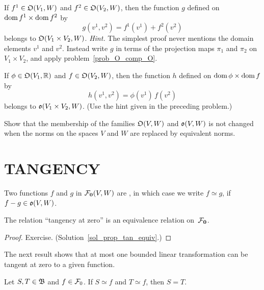 \begin{prob} If $f^1 \in \mathfrak{O}(V_1,W)$ and $f^2 \in \mathfrak{O}(V_2,W)$, then the function $g$
defined on $\operatorname{dom} f^1 \times \operatorname{dom} f^2$ by
  \[ g(v^1,v^2) = f^1(v^1) + f^2(v^2) \]
belongs to $\mathfrak{O}(V_1 \times V_2, W)$. \emph{Hint.}  The simplest proof never mentions the
domain elements $v^1$ and $v^2$. Instead write $g$ in terms of the projection maps $\pi_1$ and
$\pi_2$ on $V_1 \times V_2$, and apply problem~\ref{prob_O_comp_O}.
\end{prob}

\begin{prob} If $\phi \in \mathfrak{O}(V_1,\mathbb{R})$ and $f \in \mathfrak{O}(V_2,W)$, then the function $h$
defined on $\operatorname{dom} \phi \times \operatorname{dom} f$ by
  \[ h(v^1,v^2) = \phi(v^1)\,f(v^2) \]
belongs to $\mathfrak{o}(V_1 \times V_2,W)$. (Use the hint given in the preceding problem.)
\end{prob}

\begin{prob} Show that the membership of the families $\mathfrak{O}(V,W)$ and $\mathfrak{o}(V,W)$ is not
changed when the norms on the spaces $V$ and $W$ are replaced by equivalent norms.
\end{prob}







\section{TANGENCY}

\begin{defn} Two functions $f$ and $g$ in $\mathcal{F}_{\mathbf{0}}(V,W)$ are
, in which case we write
$f \simeq g$, if $f - g \in \mathfrak{o}(V,W)$.
\end{defn}

\begin{prop}\label{prop_tan_equiv} The relation ``tangency at zero'' is an equivalence relation
on~$\mathcal{F}_{\mathbf{0}}$.
\end{prop}

\begin{proof} Exercise. (Solution~\ref{sol_prop_tan_equiv}.)  \ns   \end{proof}


The next result shows that at most one bounded linear transformation can be tangent at zero to
a given function.

\begin{prop}\label{prop_tan_lin}  Let $S,T \in \mathfrak{B}$ and $f \in \mathcal{F}_0$.  If $S \simeq f$
and $T \simeq f$, then $S = T$.
\end{prop}

